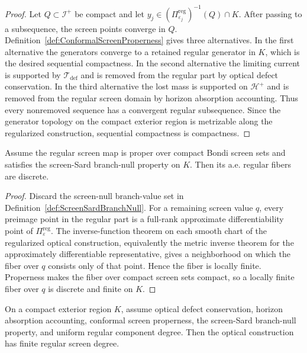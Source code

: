 \begin{proof}
Let $Q\subset\mathscr I^+$ be compact and let $y_j\in(\Pi_{\varepsilon_j}^{\mathrm{reg}})^{-1}(Q)\cap K$. After passing to a subsequence, the screen points converge in $Q$. Definition~\ref{def:ConformalScreenProperness} gives three alternatives. In the first alternative the generators converge to a retained regular generator in $K$, which is the desired sequential compactness. In the second alternative the limiting current is supported by $\mathcal T_{\mathrm{def}}$ and is removed from the regular part by optical defect conservation. In the third alternative the lost mass is supported on $\mathcal H^+$ and is removed from the regular screen domain by horizon absorption accounting. Thus every nonremoved sequence has a convergent regular subsequence. Since the generator topology on the compact exterior region is metrizable along the regularized construction, sequential compactness is compactness.
\end{proof}

\begin{lemma}\label{lem:ScreenSardDiscreteFibers}
Assume the regular screen map is proper over compact Bondi screen sets and satisfies the screen-Sard branch-null property on $K$. Then its a.e. regular fibers are discrete.
\end{lemma}

\begin{proof}
Discard the screen-null branch-value set in Definition~\ref{def:ScreenSardBranchNull}. For a remaining screen value $q$, every preimage point in the regular part is a full-rank approximate differentiability point of $\Pi_{\varepsilon}^{\mathrm{reg}}$. The inverse-function theorem on each smooth chart of the regularized optical construction, equivalently the metric inverse theorem for the approximately differentiable representative, gives a neighborhood on which the fiber over $q$ consists only of that point. Hence the fiber is locally finite. Properness makes the fiber over compact screen sets compact, so a locally finite fiber over $q$ is discrete and finite on $K$.
\end{proof}

\begin{theorem}\label{thm:ConformalPropernessFiniteDegree}
On a compact exterior region $K$, assume optical defect conservation, horizon absorption accounting, conformal screen properness, the screen-Sard branch-null property, and uniform regular component degree. Then the optical construction has finite regular screen degree.
\end{theorem}

